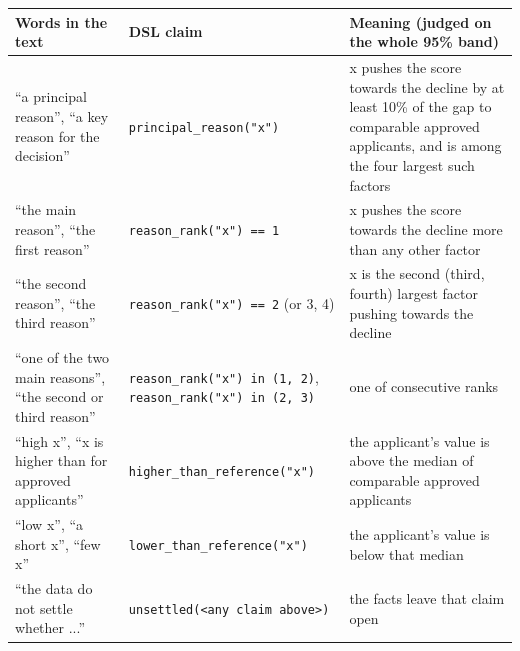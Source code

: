 \begin{tabular}{p{3.3cm}p{4.5cm}p{7cm}}
\toprule
\textbf{Words in the text} & \textbf{DSL claim} & \textbf{Meaning (judged on the whole 95\% band)} \\
\midrule
“a principal reason”, “a key reason for the decision” & \texttt{principal\_reason("x")} & x pushes the score towards the decline by at least 10\% of the gap to comparable approved applicants, and is among the four largest such factors \\
“the main reason”, “the first reason” & \texttt{reason\_rank("x") == 1} & x pushes the score towards the decline more than any other factor \\
“the second reason”, “the third reason” & \texttt{reason\_rank("x") == 2} (or 3, 4) & x is the second (third, fourth) largest factor pushing towards the decline \\
“one of the two main reasons”, “the second or third reason” & \texttt{reason\_rank("x") in (1, 2)}, \texttt{reason\_rank("x") in (2, 3)} & one of consecutive ranks \\
“high x”, “x is higher than for approved applicants” & \texttt{higher\_than\_reference("x")} & the applicant's value is above the median of comparable approved applicants \\
“low x”, “a short x”, “few x” & \texttt{lower\_than\_reference("x")} & the applicant's value is below that median \\
“the data do not settle whether ...” & \texttt{unsettled(<any claim above>)} & the facts leave that claim open \\
\bottomrule
\end{tabular}
